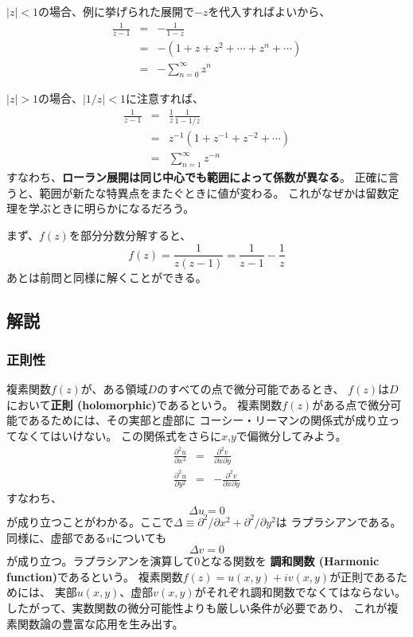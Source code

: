 $|z|<1$の場合、例に挙げられた展開で$-z$を代入すればよいから、
\begin{eqnarray}
  \frac{1}{z-1} &=& - \frac{1}{1-z}\\
  &=& -(1 + z + z^2 + \cdots + z^n + \cdots) \\
  &=& -\sum_{n=0}^{\infty} z^n
\end{eqnarray}

$|z|>1$の場合、$|1/z|<1$に注意すれば、
\begin{eqnarray}
  \frac{1}{z-1} &=& \frac{1}{z} \frac{1}{1 - 1/z}\\
  &=& z^{-1}
  \left(
  1 + z^{-1}+ z^{-2}+ \cdots
  \right)\\
  &=& \sum_{n=1}^{\infty} z^{-n}
\end{eqnarray}
すなわち、{\bf ローラン展開は同じ中心でも範囲によって係数が異なる}。
正確に言うと、範囲が新たな特異点をまたぐときに値が変わる。
これがなぜかは留数定理を学ぶときに明らかになるだろう。

まず、$f(z)$を部分分数分解すると、
\begin{equation}
  f(z) = \frac{1}{z(z-1)} = \frac{1}{z-1} - \frac{1}{z}
\end{equation}
あとは前問と同様に解くことができる。

\subsection{解説}

\subsubsection{正則性}
複素関数$f(z)$が、ある領域$D$のすべての点で微分可能であるとき、
$f(z)$は$D$において{\bf 正則 (holomorphic)}であるという。
複素関数$f(z)$がある点で微分可能であるためには、その実部と虚部に
コーシー・リーマンの関係式が成り立ってなくてはいけない。
この関係式をさらに$x$,$y$で偏微分してみよう。
\begin{eqnarray}
  \frac{\partial^2 u}{\partial x^2} &=& \frac{\partial^2 v}{\partial x \partial y}\\
  \frac{\partial^2 u}{\partial y^2} &=& - \frac{\partial^2 v}{\partial x \partial y}
\end{eqnarray}
すなわち、
\begin{equation}
  \Delta u = 0
\end{equation}
が成り立つことがわかる。ここで$\Delta \equiv \partial^2/\partial x^2 + \partial^2/\partial y^2$は
ラプラシアンである。
同様に、虚部である$v$についても
\begin{equation}
  \Delta v = 0
\end{equation}
が成り立つ。ラプラシアンを演算して0となる関数を
{\bf 調和関数 (Harmonic function)}であるという。
複素関数$f(z)= u(x,y) + i v(x,y)$が正則であるためには、
実部$u(x,y)$、虚部$v(x,y)$がそれぞれ調和関数でなくてはならない。
したがって、実数関数の微分可能性よりも厳しい条件が必要であり、
これが複素関数論の豊富な応用を生み出す。

